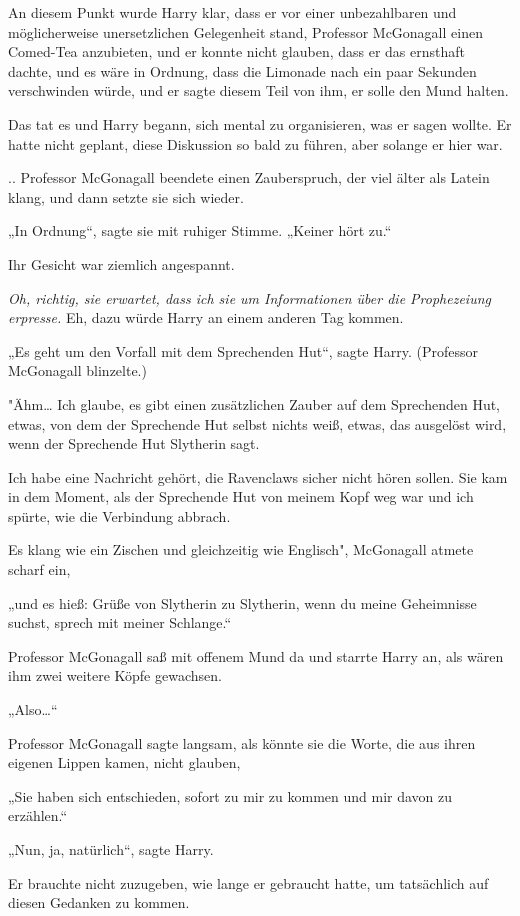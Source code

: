{An diesem Punkt wurde Harry klar, dass er vor einer unbezahlbaren und möglicherweise unersetzlichen Gelegenheit stand, Professor McGonagall einen Comed-Tea anzubieten, und er konnte nicht glauben, dass er das ernsthaft dachte, und es wäre in Ordnung, dass die Limonade nach ein paar Sekunden verschwinden würde, und er sagte diesem Teil von ihm, er solle den Mund halten.

Das tat es und Harry begann, sich mental zu organisieren, was er sagen wollte. Er hatte nicht geplant, diese Diskussion so bald zu führen, aber solange er hier war.

.. Professor McGonagall beendete einen Zauberspruch, der viel älter als Latein klang, und dann setzte sie sich wieder.

„In Ordnung“, sagte sie mit ruhiger Stimme. „Keiner hört zu.“

Ihr Gesicht war ziemlich angespannt.

\emph{Oh, richtig, sie erwartet, dass ich sie um Informationen über die Prophezeiung erpresse.} Eh, dazu würde Harry an einem anderen Tag kommen.

„Es geht um den Vorfall mit dem Sprechenden Hut“, sagte Harry. (Professor McGonagall blinzelte.)

"Ähm… Ich glaube, es gibt einen zusätzlichen Zauber auf dem Sprechenden Hut, etwas, von dem der Sprechende Hut selbst nichts weiß, etwas, das ausgelöst wird, wenn der Sprechende Hut Slytherin sagt.

Ich habe eine Nachricht gehört, die Ravenclaws sicher nicht hören sollen. Sie kam in dem Moment, als der Sprechende Hut von meinem Kopf weg war und ich spürte, wie die Verbindung abbrach.

Es klang wie ein Zischen und gleichzeitig wie Englisch", McGonagall atmete scharf ein,

„und es hieß: Grüße von Slytherin zu Slytherin, wenn du meine Geheimnisse suchst, sprech mit meiner Schlange.“

Professor McGonagall saß mit offenem Mund da und starrte Harry an, als wären ihm zwei weitere Köpfe gewachsen.

„Also…“

Professor McGonagall sagte langsam, als könnte sie die Worte, die aus ihren eigenen Lippen kamen, nicht glauben,

„Sie haben sich entschieden, sofort zu mir zu kommen und mir davon zu erzählen.“

„Nun, ja, natürlich“, sagte Harry.

Er brauchte nicht zuzugeben, wie lange er gebraucht hatte, um tatsächlich auf diesen Gedanken zu kommen.

}
